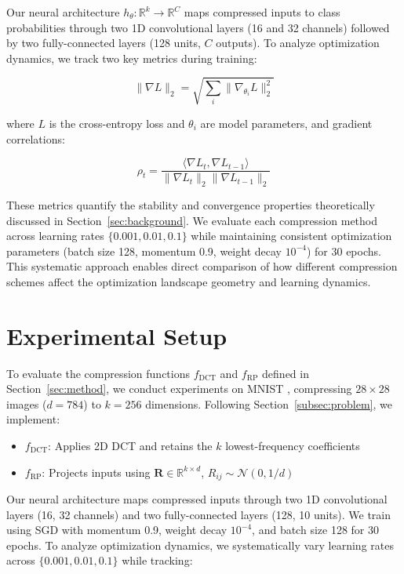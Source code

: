 \documentclass{article} %
\begin{document}
Our neural architecture $h_\theta: \mathbb{R}^k \rightarrow \mathbb{R}^C$ maps compressed inputs to class probabilities through two 1D convolutional layers (16 and 32 channels) followed by two fully-connected layers (128 units, $C$ outputs). To analyze optimization dynamics, we track two key metrics during training:

\begin{equation}
\label{eq:grad_norm}
    \|\nabla L\|_2 = \sqrt{\sum_{i} \|\nabla_{\theta_i} L\|_2^2}
\end{equation}

where $L$ is the cross-entropy loss and $\theta_i$ are model parameters, and gradient correlations:

\begin{equation}
\label{eq:grad_corr}
    \rho_t = \frac{\langle \nabla L_t, \nabla L_{t-1} \rangle}{\|\nabla L_t\|_2 \|\nabla L_{t-1}\|_2}
\end{equation}

These metrics quantify the stability and convergence properties theoretically discussed in Section~\ref{sec:background}. We evaluate each compression method across learning rates $\{0.001, 0.01, 0.1\}$ while maintaining consistent optimization parameters (batch size 128, momentum 0.9, weight decay $10^{-4}$) for 30 epochs. This systematic approach enables direct comparison of how different compression schemes affect the optimization landscape geometry and learning dynamics.

\section{Experimental Setup}
\label{sec:experimental}

To evaluate the compression functions $f_{\text{DCT}}$ and $f_{\text{RP}}$ defined in Section~\ref{sec:method}, we conduct experiments on MNIST \citep{LeCun1998GradientbasedLA}, compressing $28 \times 28$ images ($d=784$) to $k=256$ dimensions. Following Section~\ref{subsec:problem}, we implement:

\begin{itemize}
    \item $f_{\text{DCT}}$: Applies 2D DCT and retains the $k$ lowest-frequency coefficients
    \item $f_{\text{RP}}$: Projects inputs using $\mathbf{R} \in \mathbb{R}^{k \times d}$, $R_{ij} \sim \mathcal{N}(0,1/d)$
\end{itemize}

Our neural architecture maps compressed inputs through two 1D convolutional layers (16, 32 channels) and two fully-connected layers (128, 10 units). We train using SGD with momentum 0.9, weight decay $10^{-4}$, and batch size 128 for 30 epochs. To analyze optimization dynamics, we systematically vary learning rates across $\{0.001, 0.01, 0.1\}$ while tracking:
\end{document}
